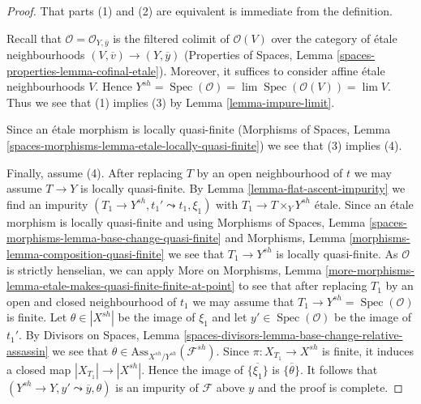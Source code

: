 \documentclass[10pt,a4paper]{amsart}
\theoremstyle{plain}
\theoremstyle{definition}
\theoremstyle{remark}
\numberwithin{equation}{subsection}
\def\lim{\mathop{\mathrm{lim}}\nolimits}
\def\Spec{\mathop{\mathrm{Spec}}}
\begin{document}
\begin{proof}
That parts (1) and (2) are equivalent is immediate from the definition.

\medskip\noindent
Recall that $\mathcal{O} = \mathcal{O}_{Y, \overline{y}}$
is the filtered colimit of $\mathcal{O}(V)$ over the category
of \'etale neighbourhoods $(V, \overline{v}) \to (Y, \overline{y})$
(Properties of Spaces, Lemma \ref{spaces-properties-lemma-cofinal-etale}).
Moreover, it suffices to consider affine \'etale neighbourhoods $V$.
Hence $Y^{sh} = \Spec(\mathcal{O}) = \lim \Spec(\mathcal{O}(V)) = \lim V$.
Thus we see that (1) implies (3) by Lemma \ref{lemma-impure-limit}.

\medskip\noindent
Since an \'etale morphism is locally quasi-finite
(Morphisms of Spaces, Lemma
\ref{spaces-morphisms-lemma-etale-locally-quasi-finite})
we see that (3) implies (4).

\medskip\noindent
Finally, assume (4). After replacing $T$ by an open neighbourhood of $t$
we may assume $T \to Y$ is locally quasi-finite.
By Lemma \ref{lemma-flat-ascent-impurity}
we find an impurity
$(T_1 \to Y^{sh}, t_1' \leadsto t_1, \xi_1)$
with $T_1 \to T \times_Y Y^{sh}$
\'etale. Since an \'etale morphism is locally quasi-finite
and using Morphisms of Spaces, Lemma
\ref{spaces-morphisms-lemma-base-change-quasi-finite} and
Morphisms, Lemma \ref{morphisms-lemma-composition-quasi-finite}
we see that $T_1 \to Y^{sh}$ is locally quasi-finite.
As $\mathcal{O}$ is strictly henselian, we can apply More on Morphisms, Lemma
\ref{more-morphisms-lemma-etale-makes-quasi-finite-finite-at-point}
to see that after replacing $T_1$ by an open and closed neighbourhood
of $t_1$ we may assume that $T_1 \to Y^{sh} = \Spec(\mathcal{O})$
is finite. Let $\theta \in |X^{sh}|$ be the image of
$\xi_1$ and let $y' \in \Spec(\mathcal{O})$ be the image
of $t_1'$. By Divisors on Spaces, Lemma
\ref{spaces-divisors-lemma-base-change-relative-assassin}
we see that $\theta \in \text{Ass}_{X^{sh}/Y^{sh}}(\mathcal{F}^{sh})$.
Since $\pi : X_{T_1} \to X^{sh}$
is finite, it induces a closed map $|X_{T_1}| \to |X^{sh}|$.
Hence the image of $\overline{\{\xi_1\}}$ is $\overline{\{\theta\}}$.
It follows that $(Y^{sh} \to Y, y' \leadsto \overline{y}, \theta)$
is an impurity of $\mathcal{F}$ above $y$ and the proof is complete.
\end{proof}
\end{document}
